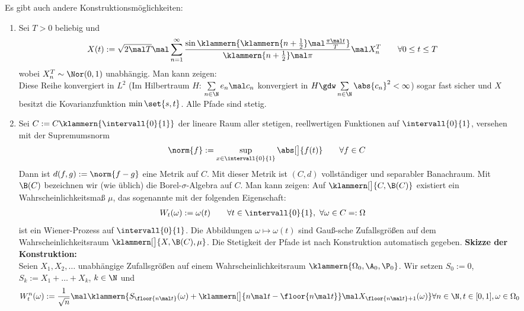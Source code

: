 \begin{bemerkungnr}\label{bem3.1.9}
	Es gibt auch andere Konstruktionsmöglichkeiten:
	\begin{enumerate}[label=(\alph*)]
		\item Sei $T>0$ beliebig und
		\begin{align*}
			X(t)&:=\sqrt{2\mal T}\mal\sum\limits_{n=1}^\infty\frac{\sin\klammern{\klammern{n+\frac{1}{2}}\mal\frac{\pi\mal t}{T}}}{\klammern{n+\frac{1}{2}}\mal\pi}\mal X_n^T\qquad\forall 0\leq t\leq T
		\end{align*}
		wobei $X_n^T\sim\Nor(0,1)$ unabhängig. Man kann zeigen:\\
		Diese Reihe konvergiert in $L^2$ 
		(Im Hilbertraum $H$: $\sum\limits_{n\in\N}e_n\mal c_n$ konvergiert in $H\gdw\sum\limits_{n\in\N}\abs{c_n}^2<\infty$)
		sogar fast sicher und $X$ besitzt die Kovarianzfunktion $\min\set{s,t}$.
		Alle Pfade sind stetig.
		\item Sei $C:=C\klammern{\intervall{0}{1}}$ der lineare Raum aller stetigen, reellwertigen Funktionen auf $\intervall{0}{1}$, versehen mit der Supremumsnorm
		\begin{align*}
			\norm{f}:=\sup\limits_{x\in\intervall{0}{1}}\abs[\big]{f(t)}\qquad\forall f\in C
		\end{align*}
		Dann ist $d(f,g):=\norm{f-g}$ eine Metrik auf $C$.
		Mit dieser Metrik ist $(C,d)$ vollständiger und separabler Banachraum.
		Mit $\B(C)$ bezeichnen wir (wie üblich) die Borel-$\sigma$-Algebra auf $C$.
		Man kann zeigen:
		Auf $\klammern[\big]{C,\B(C)}$ existiert ein Wahrscheinlichkeitsmaß $\mu$, das sogenannte  mit der folgenden Eigenschaft:
		\begin{align*}
			W_t(\omega)&:=\omega(t)\qquad\forall t\in\intervall{0}{1},~\forall\omega\in C=:\Omega
		\end{align*}
		ist ein Wiener-Prozess auf $\intervall{0}{1}$.\nl
		 Die Abbildungen $\omega\mapsto\omega(t)$ sind Gauß-sche Zufallsgrößen auf dem Wahrscheinlichkeitsraum $\klammern[\big]{X,\B(C),\mu}$.
		Die Stetigkeit der Pfade ist nach Konstruktion automatisch gegeben.\nl
		\textbf{Skizze der Konstruktion:}\\
		Seien $X_1,X_2,\ldots$ unabhängige Zufallsgrößen auf einem Wahrscheinlichkeitsraum $\klammern{\Omega_0,\A_0,\P_0}$.
		Wir setzen $S_0:=0$, $S_k:=X_1+\ldots+X_k$, $k\in\N$ und
		\begin{align*}
			W_t^n(\omega)&:=\frac{1}{\sqrt{n}}\mal\klammern{S_{\floor{n\mal t}}(\omega)+\klammern[\big]{n\mal t-\floor{n\mal t}}\mal X_{\floor{n\mal t}+1}(\omega)}
			\forall n\in\N, t\in[0,1],\omega\in\Omega_0
		\end{align*}
	\end{enumerate}
\end{bemerkungnr}




